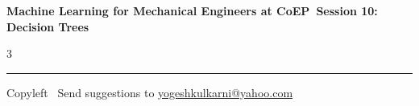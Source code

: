 \documentclass[8pt,landscape]{article}
\begin{document}
\footnotesize

\begin{center}
\Large{\textbf{Machine Learning for Mechanical Engineers at CoEP\ Session 10: Decision Trees}}
\end{center}

\begin{multicols}{3}

\end{multicols}

\rule{\linewidth}{0.25pt}
\scriptsize
Copyleft \textcopyleft\  Send suggestions to
\href{http://www.yogeshkulkarni.com}{yogeshkulkarni@yahoo.com}
\end{document}
